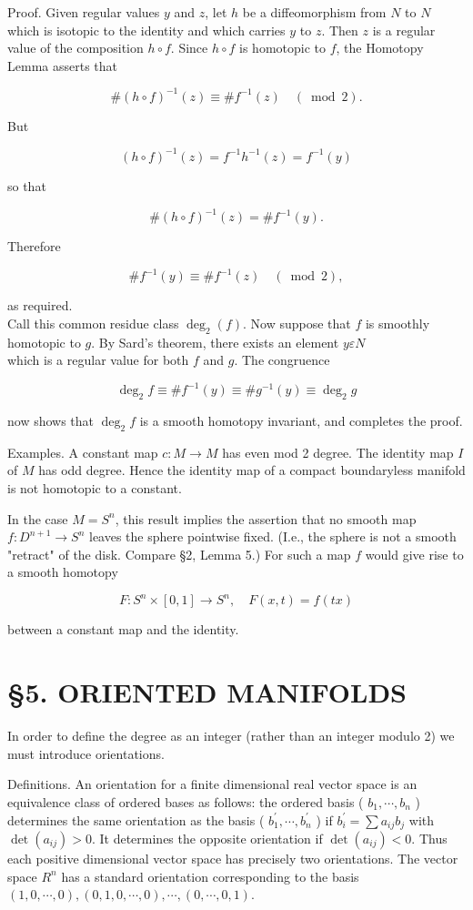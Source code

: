 \documentclass[10pt, letterpaper]{article}
\begin{document}
Proof. Given regular values $y$ and $z$, let $h$ be a diffeomorphism from $N$ to $N$ which is isotopic to the identity and which carries $y$ to $z$. Then $z$ is a regular value of the composition $h \circ f$. Since $h \circ f$ is homotopic to $f$, the Homotopy Lemma asserts that

$$
\#(h \circ f)^{-1}(z) \equiv \# f^{-1}(z) \quad(\bmod 2) .
$$

But

$$
(h \circ f)^{-1}(z)=f^{-1} h^{-1}(z)=f^{-1}(y)
$$

so that

$$
\#(h \circ f)^{-1}(z)=\# f^{-1}(y) .
$$

Therefore

$$
\# f^{-1}(y) \equiv \# f^{-1}(z) \quad(\bmod 2),
$$

as required.\\
Call this common residue class $\operatorname{deg}_{2}(f)$. Now suppose that $f$ is smoothly homotopic to $g$. By Sard's theorem, there exists an element $y \varepsilon N$\\
which is a regular value for both $f$ and $g$. The congruence

$$
\operatorname{deg}_{2} f \equiv \# f^{-1}(y) \equiv \# g^{-1}(y) \equiv \operatorname{deg}_{2} g
$$

now shows that $\operatorname{deg}_{2} f$ is a smooth homotopy invariant, and completes the proof.

Examples. A constant map $c: M \rightarrow M$ has even mod 2 degree. The identity map $I$ of $M$ has odd degree. Hence the identity map of a compact boundaryless manifold is not homotopic to a constant.

In the case $M=S^{n}$, this result implies the assertion that no smooth map $f: D^{n+1} \rightarrow S^{n}$ leaves the sphere pointwise fixed. (I.e., the sphere is not a smooth "retract" of the disk. Compare §2, Lemma 5.) For such a map $f$ would give rise to a smooth homotopy

$$
F: S^{n} \times[0,1] \rightarrow S^{n}, \quad F(x, t)=f(t x)
$$

between a constant map and the identity.

\section*{§5. ORIENTED MANIFOLDS}
In order to define the degree as an integer (rather than an integer modulo 2) we must introduce orientations.

Definitions. An orientation for a finite dimensional real vector space is an equivalence class of ordered bases as follows: the ordered basis ( $b_{1}, \cdots, b_{n}$ ) determines the same orientation as the basis ( $b_{1}^{\prime}, \cdots, b_{n}^{\prime}$ ) if $b_{i}^{\prime}=\sum a_{i j} b_{j}$ with $\operatorname{det}\left(a_{i j}\right)>0$. It determines the opposite orientation if $\operatorname{det}\left(a_{i j}\right)<0$. Thus each positive dimensional vector space has precisely two orientations. The vector space $R^{n}$ has a standard orientation corresponding to the basis $(1,0, \cdots, 0),(0,1,0, \cdots, 0), \cdots,(0, \cdots, 0,1)$.
\end{document}
